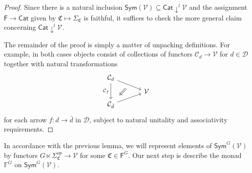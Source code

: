 \documentclass[a4paper,10pt
,draft
]{article}%
\renewcommand{\1}{\eta}%
\begin{document}
\begin{proof}
Since there is a natural inclusion
$\mathsf{Sym}(\mathcal{V}) 
\subseteq 
\mathsf{Cat} \downarrow^l \mathcal{V}$
and the assignment $\mathsf{F} \to \mathsf{Cat}$ 
given by $\mathfrak{C} \mapsto \Sigma_{\mathfrak{C}}$ 
is faithful, it suffices to check the more general claim concerning
$\mathsf{Cat} \downarrow^l \mathcal{V}$.

The remainder of the proof is simply a matter of unpacking definitions. For example, in both cases objects consist of collections of functors $\mathcal{C}_d \to \mathcal{V}$ for $d \in \mathcal{D}$ together with natural transformations
	\begin{equation}
	\begin{tikzcd}[row sep = tiny, column sep = 35pt]
		\mathcal{C}_{d} \arrow{dr}[name=U]{} \arrow{dd}[swap]{\mathcal{C}_{f}}
	\\
		& \mathcal{V}
	\\
		|[alias=V]| \mathcal{C}_{\bar{d}} \arrow{ur}[swap]{}
	\arrow[Leftarrow, from=V, to=U,shorten >=0.25cm,shorten <=0.25cm
	,swap
	]
	\end{tikzcd}
	\end{equation}
for each arrow $f \colon d \to \bar{d}$ in $\mathcal{D}$, subject to natural unitality and associativity requirements.
\end{proof}



In accordance with the previous lemma, we will represent elements of $\mathsf{Sym}^G(\mathcal{V})$
by functors
$G \ltimes \Sigma_{\mathfrak{C}}^{op} \to \mathcal{V}$ for some $\mathfrak{C} \in \mathsf{F}^G$.
Our next step is describe the monad $\mathbb{F}^G$ on $\mathsf{Sym}^G(\mathcal{V})$.
\end{document}
